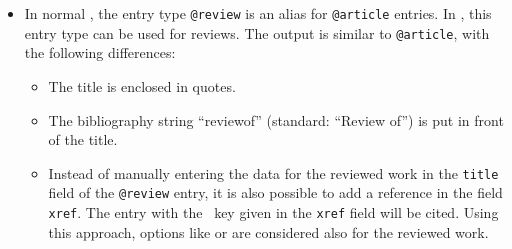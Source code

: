 \documentclass[english]{scrartcl}
\begin{document}
\begin{itemize}
	\item In
        normal \bl{}, the entry type \texttt{@review} is an alias for 
	      \texttt{@article} entries. In \bldw{}, this entry type can be used 
        for reviews. The output is similar to \texttt{@article}, with the
        following differences:
        \begin{itemize}
          \item The title is enclosed in quotes.
          \item The bibliography string \enquote{reviewof} (standard:
                \enquote{Review of}) is put in front of the title.
          \item Instead of manually entering the data for the reviewed work in the \texttt{title}
                field of the \texttt{@review} entry, it is also possible to add a reference in the field
                \texttt{xref}. The entry with the \BibTeX\ key given in the \texttt{xref} field
                will be cited. Using this approach, options like  or 
                 are considered also for the reviewed work.
        \end{itemize}
\end{itemize}
\end{document}
